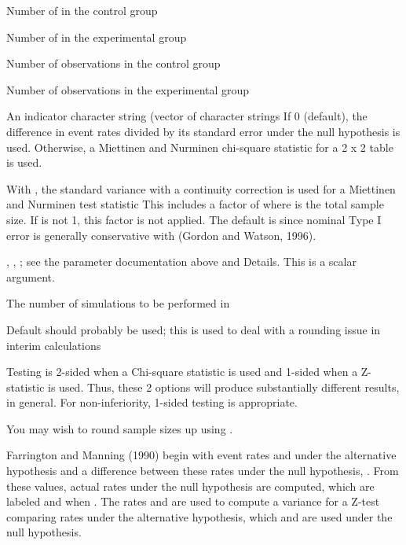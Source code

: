 \begin{Arguments}
\begin{ldescription}
\item[\code{x1}] Number of  in the control group
\item[\code{x2}] Number of  in the experimental group
\item[\code{n1}] Number of observations in the control group
\item[\code{n2}] Number of observations in the experimental group
\item[\code{chisq}] An indicator character string (vector of character strings
If 0 (default), the difference in event rates divided by its standard error under the null hypothesis is used. 
Otherwise, a Miettinen and Nurminen chi-square statistic for a 2 x 2 table is used.
\item[\code{adj}] With , the standard variance with a continuity correction is used for a Miettinen and Nurminen test statistic 
This includes a factor of  where  is the total sample size. If  is not 1, 
this factor is not applied. The default is  since nominal Type I error is generally conservative with 
(Gordon and Watson, 1996).
\item[\code{scale}] , , ; see the  parameter documentation above and Details. 
This is a scalar argument.
\item[\code{nsim}] The number of simulations to be performed in 
\item[\code{tol}] Default should probably be used; this is used to deal with a rounding issue in interim calculations
\end{ldescription}
\end{Arguments}
\begin{Details}\relax
Testing is 2-sided when a Chi-square statistic is used and 1-sided when a Z-statistic is used.
Thus, these 2 options will produce substantially different results, in general.
For non-inferiority, 1-sided testing is appropriate.

You may wish to round sample sizes up using .

Farrington and Manning (1990) begin with event rates  and  under the alternative hypothesis
and a difference between these rates under the null hypothesis, .
From these values, actual rates under the null hypothesis are computed, which are labeled  and 
when .
The rates  and  are used to compute a variance for a Z-test comparing rates under the alternative hypothesis,
which  and  are used under the null hypothesis.
\end{Details}
